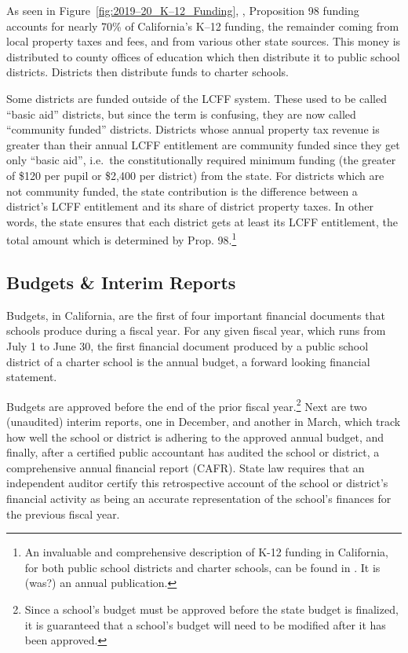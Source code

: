 As seen in Figure~\ref{fig:2019–20_K–12_Funding}, \textit{}, Proposition 98 funding accounts for nearly 70\% of California's K–12 funding, the remainder coming from local property taxes and fees, and from various other state sources. This money is distributed to county offices of education which then distribute it to public school districts. Districts then distribute funds to charter schools.

Some districts are funded outside of the LCFF system. These used to be called ``basic aid'' districts, but since the term is confusing, they are now called ``community funded'' districts. Districts whose annual property tax revenue is greater than their annual LCFF entitlement are community funded since they get only ``basic aid'', i.e.~the constitutionally required minimum funding (the greater of \$120 per pupil or \$2,400 per district) from the state. For districts which are not community funded, the state contribution is the difference between a district's LCFF entitlement and its share of district property taxes. In other words, the state ensures that each district gets at least its LCFF entitlement, the total amount which is determined by Prop. 98.\footnote{An invaluable and comprehensive description of K-12 funding in California, for both public school districts and charter schools, can be found in \textcite{Aguinaldo.etal2021}. It is (was?) an annual publication.}

\subsection{Budgets \& Interim Reports}\indent

Budgets, in California, are the first of four important financial documents that schools produce during a fiscal year. For any given fiscal year, which runs from July 1 to June 30, the first financial document produced by a public school district of a charter school is the annual budget, a forward looking financial statement. 

Budgets are approved before the end of the prior fiscal year.\footnote{Since a school's budget must be approved before the state budget is finalized, it is guaranteed that a school's budget will need to be modified after it has been approved.} Next are two (unaudited) interim reports, one in December, and another in March,  which track how well the school or district is adhering to the approved annual budget, and finally, after a certified public accountant has audited the school or district, a comprehensive annual financial report (CAFR). State law requires that an independent auditor certify this retrospective account of the school or district's financial activity as being an accurate representation of the school's finances for the previous fiscal year.

